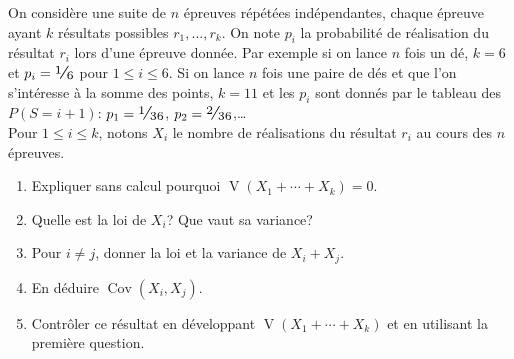 \documentclass[a4paper,12pt,reqno]{amsart}
\DeclareMathOperator{\V}{V}
\DeclareMathOperator{\Cov}{Cov}
\begin{document}
\begin{exo}

  On considère une suite de $n$ épreuves répétées indépendantes, chaque épreuve ayant $k$ résultats possibles $r_1,\ldots,r_k$. On note $p_i$ la probabilité de réalisation du résultat $r_i$ lors d'une épreuve donnée. Par exemple si on lance $n$ fois un dé, $k=6$ et $p_i=\dsfrac{1}{6}$ pour $1\leq i\leq 6$. Si on lance $n$ fois une paire de dés et que l'on s'intéresse à la somme des points, $k=11$ et les $p_i$ sont donnés par le tableau des $P(S=i+1)$: $p_1=\dsfrac{1}{36}$, $p_2=\dsfrac{2}{36}$,\dots \\
  Pour $1\leq i\leq k$, notons $X_i$ le nombre de réalisations du résultat $r_i$ au cours des $n$ épreuves.

  \begin{enumerate}
    \item Expliquer sans calcul pourquoi $\V(X_1+\cdots +X_k)=0$.
    \item Quelle est la loi de $X_i$? Que vaut sa variance?
    \item Pour $i\neq j$, donner la loi et la variance de $X_i+X_j$.
    \item En déduire $\Cov(X_i,X_j)$.
    \item Contrôler ce résultat en développant $\V(X_1+\cdots +X_k)$ et en utilisant la première question.
  \end{enumerate}

\end{exo}
\end{document}
